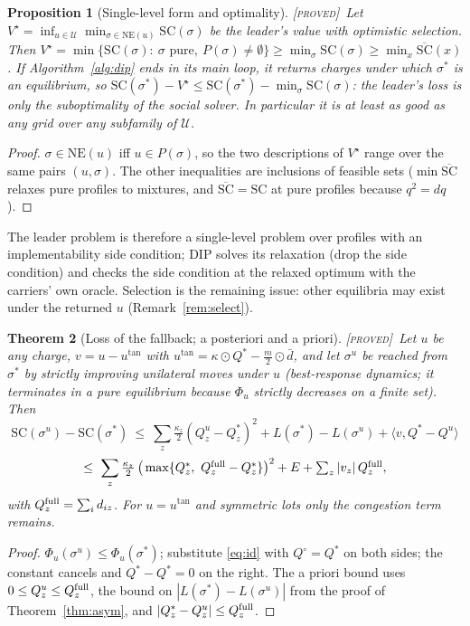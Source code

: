 \documentclass[11pt]{article}
\newtheorem{theorem}{Theorem}
\newtheorem{proposition}[theorem]{Proposition}
\theoremstyle{definition}
\theoremstyle{remark}
\newcommand{\cU}{\mathcal{U}}
\newcommand{\ip}[2]{\langle #1,#2\rangle}
\newcommand{\dbar}{\bar d}
\newcommand{\SC}{\mathrm{SC}}
\newcommand{\SCbar}{\overline{\mathrm{SC}}}
\newcommand{\NE}{\mathrm{NE}}
\newcommand{\PROVED}{{\normalfont\textsc{[proved]}}}
\begin{document}
\begin{proposition}[Single-level form and optimality]\label{prop:opt}\PROVED\
Let $V^\star=\inf_{u\in\cU}\min_{\sigma\in\NE(u)}\SC(\sigma)$ be the leader's value with optimistic selection. Then $V^\star=\min\{\SC(\sigma):\ \sigma\text{ pure},\ P(\sigma)\neq\emptyset\}\ge\min_\sigma\SC(\sigma)\ge\min_x\SCbar(x)$. If Algorithm~\ref{alg:dip} ends in its main loop, it returns charges under which $\sigma^*$ is an equilibrium, so $\SC(\sigma^*)-V^\star\le\SC(\sigma^*)-\min_\sigma\SC(\sigma)$: the leader's loss is only the suboptimality of the social solver. In particular it is at least as good as any grid over any subfamily of $\cU$.
\end{proposition}
\begin{proof}
$\sigma\in\NE(u)$ iff $u\in P(\sigma)$, so the two descriptions of $V^\star$ range over the same pairs $(u,\sigma)$. The other inequalities are inclusions of feasible sets ($\min\SCbar$ relaxes pure profiles to mixtures, and $\SCbar=\SC$ at pure profiles because $q^2=dq$).
\end{proof}

The leader problem is therefore a single-level problem over profiles with an implementability side condition; DIP solves its relaxation (drop the side condition) and checks the side condition at the relaxed optimum with the carriers' own oracle. Selection is the remaining issue: other equilibria may exist under the returned $u$ (Remark~\ref{rem:select}).

\begin{theorem}[Loss of the fallback; a posteriori and a priori]\label{thm:fallback}\PROVED\
Let $u$ be any charge, $v=u-u^{\tan}$ with $u^{\tan}=\kappa\odot Q^*-\tfrac m2\odot\dbar$, and let $\sigma^u$ be reached from $\sigma^*$ by strictly improving unilateral moves under $u$ (best-response dynamics; it terminates in a pure equilibrium because $\Phi_u$ strictly decreases on a finite set). Then
\[\SC(\sigma^u)-\SC(\sigma^*)\ \le\ \sum_z\tfrac{\kappa_z}{2}(Q^u_z-Q^*_z)^2+L(\sigma^*)-L(\sigma^u)+\ip{v}{Q^*-Q^u}\]
\[\le\ \sum_z\tfrac{\kappa_z}{2}\,\big(\textstyle\max\{Q^*_z,\ Q^{\rm full}_z-Q^*_z\}\big)^2+E+\sum_z|v_z|\,Q^{\rm full}_z,\]
with $Q^{\rm full}_z=\sum_id_{iz}$. For $u=u^{\tan}$ and symmetric lots only the congestion term remains.
\end{theorem}
\begin{proof}
$\Phi_u(\sigma^u)\le\Phi_u(\sigma^*)$; substitute \eqref{eq:id} with $Q^\circ=Q^*$ on both sides; the constant cancels and $Q^*-Q^*=0$ on the right. The a priori bound uses $0\le Q^u_z\le Q^{\rm full}_z$, the bound on $|L(\sigma^*)-L(\sigma^u)|$ from the proof of Theorem~\ref{thm:asym}, and $|Q^*_z-Q^u_z|\le Q^{\rm full}_z$.
\end{proof}
\end{document}
